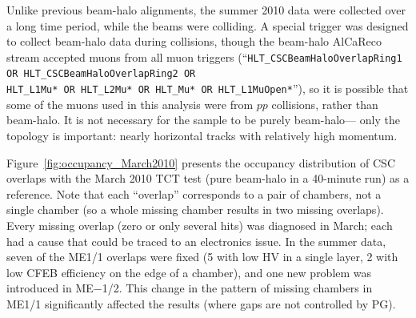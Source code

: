 \documentclass[12pt]{article}
\begin{document}
Unlike previous beam-halo alignments, the summer 2010 data were
collected over a long time period, while the beams were colliding.  A
special trigger was designed to collect beam-halo data during
collisions, though the beam-halo AlCaReco stream accepted muons from
all muon triggers (``{\tt HLT\_CSCBeamHaloOverlapRing1 OR
  HLT\_CSCBeamHaloOverlapRing2 OR \\ HLT\_L1Mu* OR HLT\_L2Mu* OR
  HLT\_Mu* OR HLT\_L1MuOpen*}''), so it is possible that some of the
muons used in this analysis were from $pp$ collisions, rather than
beam-halo.  It is not necessary for the sample to be purely
beam-halo--- only the topology is important: nearly horizontal tracks
with relatively high momentum.

Figure~\ref{fig:occupancy_March2010} presents the occupancy
distribution of CSC overlaps with the March 2010 TCT test (pure
beam-halo in a 40-minute run) as a reference.  Note that each
``overlap'' corresponds to a pair of chambers, not a single chamber
(so a whole missing chamber results in two missing overlaps).  Every
missing overlap (zero or only several hits) was diagnosed in
March; each had a cause that could be traced to an electronics issue.
In the summer data, seven of the ME1/1 overlaps were fixed (5 with low
HV in a single layer, 2 with low CFEB efficiency on the edge of a
chamber), and one new problem was introduced in ME$-$1/2.  This change
in the pattern of missing chambers in ME1/1 significantly affected the
results (where gaps are not controlled by PG).
\end{document}
